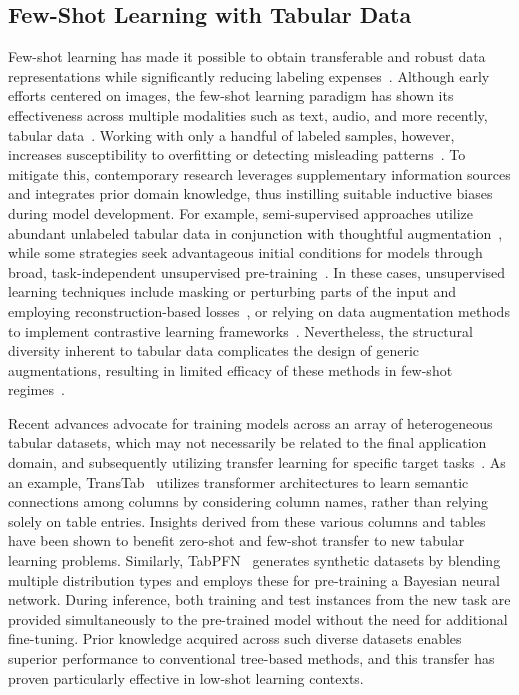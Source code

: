 \subsection{Few-Shot Learning with Tabular Data} Few-shot learning has made it possible to obtain transferable and robust data representations while significantly reducing labeling expenses~\cite{chen2018closer}. Although early efforts centered on images, the few-shot learning paradigm has shown its effectiveness across multiple modalities such as text, audio, and more recently, tabular data~\cite{majumder2022few,nam2023stunt,schick2021exploiting}. Working with only a handful of labeled samples, however, increases susceptibility to overfitting or detecting misleading patterns~\cite{bartlett2021deep}. To mitigate this, contemporary research leverages supplementary information sources and integrates prior domain knowledge, thus instilling suitable inductive biases during model development. For example, semi-supervised approaches utilize abundant unlabeled tabular data in conjunction with thoughtful augmentation~\cite{ucar2021subtab,yoon2020vime}, while some strategies seek advantageous initial conditions for models through broad, task-independent unsupervised pre-training~\cite{somepalli2021saint}. In these cases, unsupervised learning techniques include masking or perturbing parts of the input and employing reconstruction-based losses~\cite{arik2021tabnet,majmundar2022met}, or relying on data augmentation methods to implement contrastive learning frameworks~\cite{bahri2022scarf,chen2020simple}. Nevertheless, the structural diversity inherent to tabular data complicates the design of generic augmentations, resulting in limited efficacy of these methods in few-shot regimes~\cite{nam2023stunt}. 

Recent advances advocate for training models across an array of heterogeneous tabular datasets, which may not necessarily be related to the final application domain, and subsequently utilizing transfer learning for specific target tasks~\cite{zhang2023generative,levin2022transfer,zhu2023xtab}. As an example, TransTab~\cite{wang2022transtab} utilizes transformer architectures to learn semantic connections among columns by considering column names, rather than relying solely on table entries. Insights derived from these various columns and tables have been shown to benefit zero-shot and few-shot transfer to new tabular learning problems. Similarly, TabPFN~\cite{hollmann2022tabpfn} generates synthetic datasets by blending multiple distribution types and employs these for pre-training a Bayesian neural network. During inference, both training and test instances from the new task are provided simultaneously to the pre-trained model without the need for additional fine-tuning. Prior knowledge acquired across such diverse datasets enables superior performance to conventional tree-based methods, and this transfer has proven particularly effective in low-shot learning contexts.

